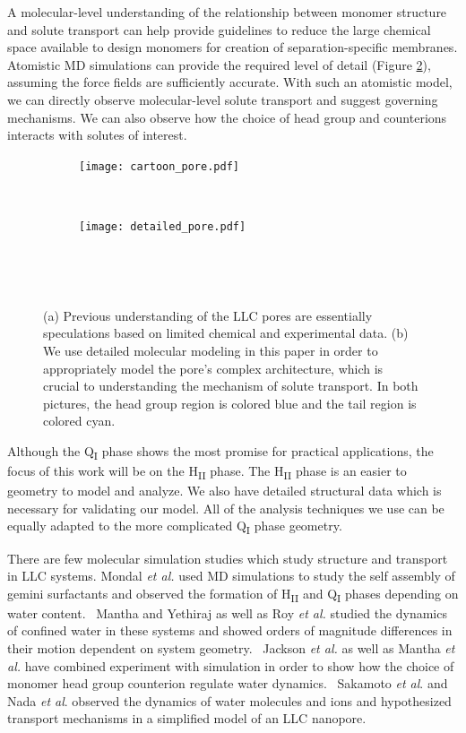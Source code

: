   A molecular-level understanding of the relationship between monomer structure
  and solute transport can help provide guidelines to reduce the large chemical 
  space available to design monomers for creation of separation-specific membranes. 
  Atomistic MD simulations can provide the required level of detail (Figure 
  \ref{fig:detailed_pore}), assuming the force fields are sufficiently accurate. 
  With such an atomistic model, we can directly observe molecular-level solute 
  transport and suggest governing mechanisms. We can also observe how the choice 
  of head group and counterions interacts with solutes of interest. 

  \begin{figure}[!htb]
  \centering
	\begin{subfigure}{0.45\linewidth}
		\centering
		\texttt{[image: cartoon\_pore.pdf]}
		\caption{}~\label{fig:undetailed_pore}
	\end{subfigure}
	\begin{subfigure}{0.45\linewidth}
		\centering
		\texttt{[image: detailed\_pore.pdf]}
		\caption{}~\label{fig:detailed_pore}
	\end{subfigure} 
    \caption{(a) Previous understanding of the LLC pores are essentially speculations 
    based on limited chemical and experimental data. (b) We use detailed molecular 
    modeling in this paper in order to appropriately model the pore's complex architecture,
    which is crucial to understanding the mechanism of solute transport. In both 
    pictures, the head group region is colored blue and the tail region is colored cyan.}~\label{fig:detail}
  \end{figure}

  Although the Q\textsubscript{I} phase shows the most promise for practical 
  applications, the focus of this work will be on the H\textsubscript{II}
  phase. The H\textsubscript{II} phase is an easier to geometry to model
  and analyze. We also have detailed structural data which is necessary for 
  validating our model. All of the analysis techniques we use can be equally
  adapted to the more complicated Q\textsubscript{I} phase geometry.
  
  There are few molecular simulation studies which study structure and transport
  in LLC systems. Mondal \textit{et al.} used MD simulations to study the self assembly 
  of gemini surfactants and observed the formation of H\textsubscript{II} and
  Q\textsubscript{I} phases depending on water content.~\cite{mondal_self-assembly_2013}
  Mantha and Yethiraj as well as Roy \textit{et al.} studied the dynamics of confined 
  water in these systems and showed orders of magnitude differences in their motion
  dependent on system geometry.~\cite{mantha_dynamics_2016,roy_water_2016}
  Jackson \textit{et al.} as well as Mantha \textit{et al.} have combined experiment
  with simulation in order to show how the choice of monomer head group counterion 
  regulate water dynamics.~\cite{jackson_ion-specific_2018,mantha_counterion-regulated_2018}
  Sakamoto \textit{et al}. and Nada \textit{et al}. observed the dynamics of water 
  molecules and ions and hypothesized transport mechanisms in a simplified model of
  an LLC nanopore.~\cite{sakamoto_development_2018,nada_transport_2020}

